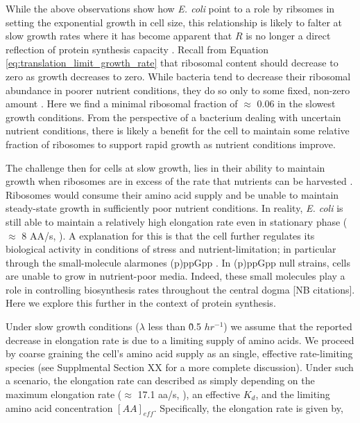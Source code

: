 While the above observations show how \textit{E. coli} point to a role by
ribsomes in setting the exponential growth in cell size, this relationship is
likely to falter at slow growth rates where it has become apparent that $R$ is
no longer a direct reflection of protein synthesis capacity \citep{dai2016}.
Recall from Equation \ref{eq:translation_limit_growth_rate} that ribosomal
content should decrease to zero as growth decreases to zero. While bacteria tend
to decrease their ribosomal abundance in poorer nutrient conditions, they do so
only to some fixed, non-zero amount \citep{scott2010, liebermeister2014}. Here
we find a minimal ribosomal fraction of $\approx$ 0.06 in the slowest growth
conditions. From the perspective of a bacterium dealing with uncertain nutrient
conditions, there is likely a benefit for the cell to maintain some relative
fraction of ribosomes to support rapid growth as nutrient conditions improve.

The challenge then for cells at slow growth, lies in their ability to maintain growth when
ribosomes are in excess of the rate that nutrients can be harvested . Ribosomes would consume their amino acid supply and
be unable to maintain steady-state growth in sufficiently poor nutrient conditions. In reality, \textit{E. coli} is still
able to maintain a relatively high elongation rate even in stationary phase
($\approx$ 8 AA/s, \citep{dai2016, dai2018}). A explanation for this is that the
cell further regulates its biological activity in conditions of stress and
nutrient-limitation; in particular through the small-molecule alarmones (p)ppGpp
\citep{harris2018}. In (p)ppGpp null strains, cells are unable to grow in
nutrient-poor media. Indeed, these small molecules play a role in controlling
biosynthesis rates throughout the central dogma [NB citations]. Here we explore
this further in the context of protein synthesis.

Under slow growth conditions ($\lambda$ less than \~ 0.5 $hr^{-1}$) we assume
that the reported decrease in elongation rate is due to a limiting supply of
amino acids. We proceed by coarse graining the cell's amino acid supply as an
single, effective rate-limiting species (see Supplmental Section XX for a more
complete discussion). Under such a scenario, the elongation rate can described
as simply depending on the maximum elongation rate ($\approx$ 17.1 aa/s,
\citep{dai2016, dai2018}), an effective $K_d$, and the limiting amino acid
concentration $[AA]_{eff}$. Specifically, the elongation rate is given by,

